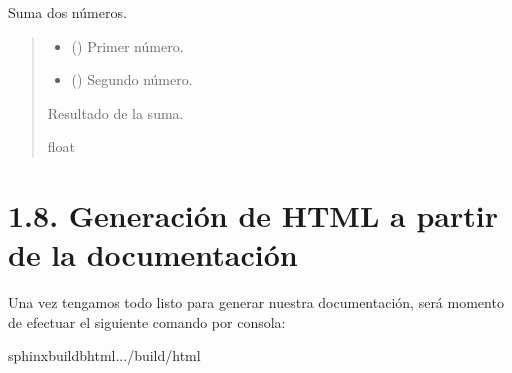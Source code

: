 \documentclass[a4paper,10pt,spanish]{sphinxmanual}
\begin{document}
\begin{fulllineitems}
\label{\detokenize{1_configuracion_inicial/src:src.operaciones.suma}}
\pysigstartsignatures
\pysiglinewithargsret
{}
{\sphinxparamcomma {}}
{}
\pysigstopsignatures
\sphinxAtStartPar
Suma dos números.
\begin{quote}\begin{description}
\begin{itemize}
\item {} 
\sphinxAtStartPar
{} () \textendash{} Primer número.

\item {} 
\sphinxAtStartPar
{} () \textendash{} Segundo número.

\end{itemize}

\sphinxAtStartPar
Resultado de la suma.

\sphinxAtStartPar
float

\end{description}\end{quote}

\end{fulllineitems}


\sphinxstepscope


\section{1.8. Generación de HTML a partir de la documentación}
\label{\detokenize{1_configuracion_inicial/generacion_html:generacion-de-html-a-partir-de-la-documentacion}}\label{\detokenize{1_configuracion_inicial/generacion_html::doc}}
\sphinxAtStartPar
Una vez tengamos todo listo para generar nuestra documentación, será momento de efectuar el siguiente comando por consola:

\begin{sphinxVerbatim}[commandchars=\\\{\}]
sphinx\PYGZhy{}build\PYGZhy{}bhtml.../build/html
\end{sphinxVerbatim}
\end{document}

